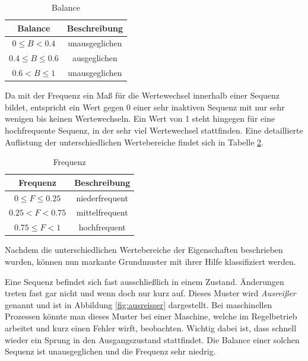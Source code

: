 \begin{table}
\label{tab:balance}
	\begin{center}
		\begin{tabular}{|c c|} 
			\hline
			Balance & Beschreibung \\
			\hline\hline
			$0 \leq B < 0.4$ & unausgeglichen \\ 
			\hline
			$0.4 \leq B \leq 0.6$ & ausgeglichen \\
			\hline
			$0.6 < B \leq 1$ & unausgeglichen \\
			\hline
		\end{tabular}
		\caption{Balance}
	\end{center}
\end{table}

Da mit der Frequenz ein Maß für die Wertewechsel innerhalb einer Sequenz bildet, entspricht ein Wert gegen 0 einer sehr inaktiven Sequenz mit nur sehr wenigen bis keinen Wertewechseln. Ein Wert von 1 steht hingegen für eine hochfrequente Sequenz, in der sehr viel Wertewechsel stattfinden. Eine detaillierte Auflistung der unterschiedlichen Wertebereiche findet sich in Tabelle \ref{tab:frequence}. 

\begin{table}
\label{tab:frequence}
	\begin{center}
		\begin{tabular}{|c c|} 
			\hline
			Frequenz & Beschreibung \\
			\hline\hline
			$0 \leq F \leq 0.25$ & niederfrequent \\ 
			\hline
			$0.25 < F < 0.75$ & mittelfrequent \\
			\hline
			$0.75 \leq F < 1$ & hochfrequent \\
			\hline
		\end{tabular}
		\caption{Frequenz}
	\end{center}
\end{table}

Nachdem die unterschiedlichen Wertebereiche der Eigenschaften beschrieben wurden, können nun markante Grundmuster mit ihrer Hilfe klassifiziert werden.

Eine Sequenz befindet sich fast ausschließlich in einem Zustand. Änderungen treten fast gar nicht und wenn doch nur kurz auf. Dieses Muster wird \textit{Ausreißer} genannt und ist in Abbildung \ref{fig:ausreisser} dargestellt. Bei maschinellen Prozessen könnte man dieses Muster bei einer Maschine, welche im Regelbetrieb arbeitet und kurz einen Fehler wirft, beobachten. Wichtig dabei ist, dass schnell wieder ein Sprung in den Ausgangszustand stattfindet. Die Balance einer solchen Sequenz ist unausgeglichen und die Frequenz sehr niedrig.\\

